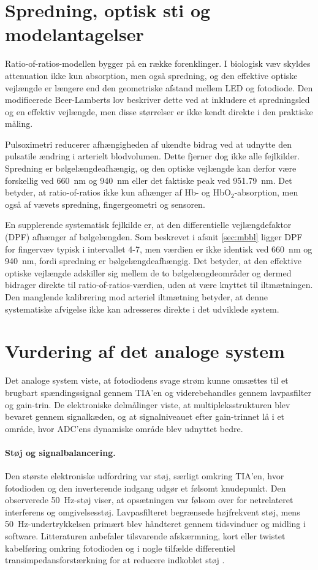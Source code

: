 \section{Spredning, optisk sti og modelantagelser}
Ratio-of-ratios-modellen bygger på en række forenklinger. I biologisk væv skyldes attenuation ikke kun absorption, men også spredning, og den effektive optiske vejlængde er længere end den geometriske afstand mellem LED og fotodiode. Den modificerede Beer-Lamberts lov beskriver dette ved at inkludere et spredningsled og en effektiv vejlængde, men disse størrelser er ikke kendt direkte i den praktiske måling.

Pulsoximetri reducerer afhængigheden af ukendte bidrag ved at udnytte den pulsatile ændring i arterielt blodvolumen. Dette fjerner dog ikke alle fejlkilder. Spredning er bølgelængdeafhængig, og den optiske vejlængde kan derfor være forskellig ved \SI{660}{nm} og \SI{940}{nm} eller det faktiske peak ved \SI{951.79}{nm}. Det betyder, at ratio-of-ratios ikke kun afhænger af Hb- og HbO$_2$-absorption, men også af vævets spredning, fingergeometri og sensoren.

En supplerende systematisk fejlkilde er, at den differentielle vejlængdefaktor (DPF) afhænger af bølgelængden. Som beskrevet i afsnit \ref{sec:mbbl} ligger DPF for fingervæv typisk i intervallet 4-7, men værdien er ikke identisk ved \SI{660}{nm} og \SI{940}{nm}, fordi spredning er bølgelængdeafhængig. Det betyder, at den effektive optiske vejlængde adskiller sig mellem de to bølgelængdeområder og dermed bidrager direkte til ratio-of-ratios-værdien, uden at være knyttet til iltmætningen. Den manglende kalibrering mod arteriel iltmætning betyder, at denne systematiske afvigelse ikke kan adresseres direkte i det udviklede system.

\section{Vurdering af det analoge system}
Det analoge system viste, at fotodiodens svage strøm kunne omsættes til et brugbart spændingssignal gennem TIA'en og viderebehandles gennem lavpasfilter og gain-trin. De elektroniske delmålinger viste, at multipleksstrukturen blev bevaret gennem signalkæden, og at signalniveauet efter gain-trinnet lå i et område, hvor ADC'ens dynamiske område blev udnyttet bedre.

\paragraph{Støj og signalbalancering.}
Den største elektroniske udfordring var støj, særligt omkring TIA'en, hvor fotodioden og den inverterende indgang udgør et følsomt knudepunkt. Den observerede \SI{50}{Hz}-støj viser, at opsætningen var følsom over for netrelateret interferens og omgivelsesstøj. Lavpasfilteret begrænsede højfrekvent støj, mens \SI{50}{Hz}-undertrykkelsen primært blev håndteret gennem tidsvinduer og midling i software. Litteraturen anbefaler tilsvarende afskærmning, kort eller twistet kabelføring omkring fotodioden og i nogle tilfælde differentiel transimpedansforstærkning for at reducere indkoblet støj \cite[s.~82--83]{Webster1997}.

